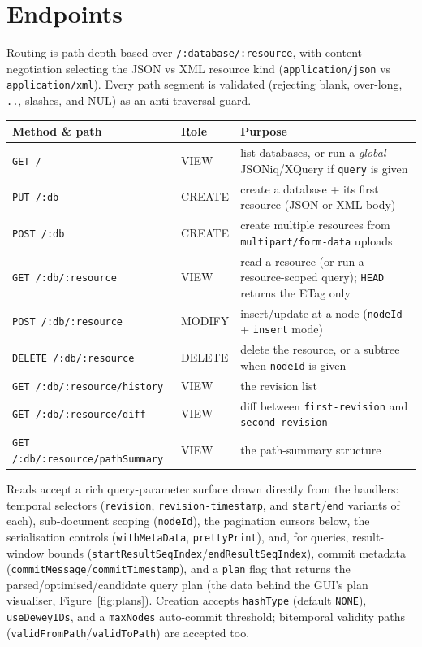 \documentclass[11pt,a4paper,oneside]{report}
\theoremstyle{sirixthm}
\newcommand{\code}[1]{\texttt{#1}}
\begin{document}
\section{Endpoints}

Routing is path-depth based over \code{/:database/:resource}, with content negotiation selecting
the JSON vs XML resource kind (\code{application/json} vs \code{application/xml}). Every path
segment is validated (rejecting blank, over-long, \code{..}, slashes, and NUL) as an
anti-traversal guard.

\begin{table}[h]
\small\setlength{\tabcolsep}{5pt}
\renewcommand{\arraystretch}{1.2}
\begin{tabularx}{\linewidth}{@{}l l X@{}}
\toprule
\textbf{Method \& path} & \textbf{Role} & \textbf{Purpose}\\
\midrule
\code{GET /} & VIEW & list databases, or run a \emph{global} JSONiq/XQuery if \code{query} is given\\
\code{PUT /:db} & CREATE & create a database {+} its first resource (JSON or XML body)\\
\code{POST /:db} & CREATE & create multiple resources from \code{multipart/form-data} uploads\\
\code{GET /:db/:resource} & VIEW & read a resource (or run a resource-scoped query); \code{HEAD} returns the ETag only\\
\code{POST /:db/:resource} & MODIFY & insert/update at a node (\code{nodeId} {+} \code{insert} mode)\\
\code{DELETE /:db/:resource} & DELETE & delete the resource, or a subtree when \code{nodeId} is given\\
\code{GET /:db/:resource/history} & VIEW & the revision list\\
\code{GET /:db/:resource/diff} & VIEW & diff between \code{first-revision} and \code{second-revision}\\
\code{GET /:db/:resource/pathSummary} & VIEW & the path-summary structure\\
\bottomrule
\end{tabularx}
\end{table}

Reads accept a rich query-parameter surface drawn directly from the handlers: temporal selectors
(\code{revision}, \code{revision-timestamp}, and \code{start}/\allowbreak\code{end} variants of each),
sub-document scoping (\code{nodeId}), the pagination cursors below, the serialisation controls
(\code{withMetaData}, \code{prettyPrint}), and, for queries, result-window bounds
(\code{startResultSeqIndex}/\allowbreak\code{endResultSeqIndex}), commit metadata
(\code{commitMessage}/\allowbreak\code{commitTimestamp}), and a \code{plan} flag that returns the
parsed/optimised/candidate query plan (the data behind the GUI's plan visualiser,
Figure~\ref{fig:plans}). Creation accepts \code{hashType} (default \code{NONE}), \code{useDeweyIDs},
and a \code{maxNodes} auto-commit threshold; bitemporal validity paths
(\code{validFromPath}/\allowbreak\code{validToPath}) are accepted too.
\end{document}
